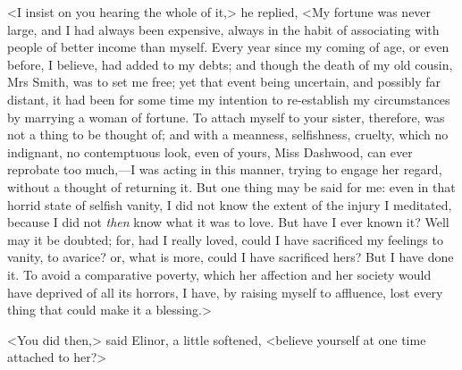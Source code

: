 <I insist on you hearing the whole of it,> he replied, <My fortune was never large, and I had always been expensive, always in the habit of associating with people of better income than myself. Every year since my coming of age, or even before, I believe, had added to my debts; and though the death of my old cousin, Mrs Smith, was to set me free; yet that event being uncertain, and possibly far distant, it had been for some time my intention to re-establish my circumstances by marrying a woman of fortune. To attach myself to your sister, therefore, was not a thing to be thought of; and with a meanness, selfishness, cruelty, which no indignant, no contemptuous look, even of yours, Miss Dashwood, can ever reprobate too much,—I was acting in this manner, trying to engage her regard, without a thought of returning it. But one thing may be said for me: even in that horrid state of selfish vanity, I did not know the extent of the injury I meditated, because I did not \textit{then} know what it was to love. But have I ever known it? Well may it be doubted; for, had I really loved, could I have sacrificed my feelings to vanity, to avarice? or, what is more, could I have sacrificed hers? But I have done it. To avoid a comparative poverty, which her affection and her society would have deprived of all its horrors, I have, by raising myself to affluence, lost every thing that could make it a blessing.>

<You did then,> said Elinor, a little softened, <believe yourself at one time attached to her?>

